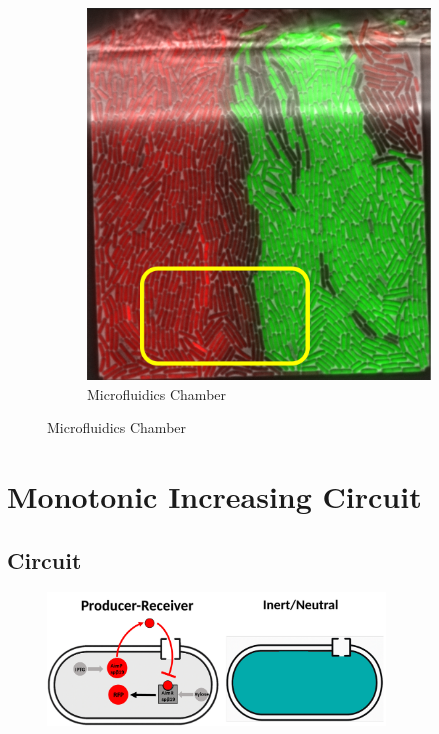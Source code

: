 \documentclass[11pt,a4paper]{article}
\begin{document}
\begin{figure}[H]
    \hfill
    \begin{subfigure}[b]{0.45\textwidth}
        \centering
        \includegraphics[width=\textwidth]{../figures/monotonicDecreasingReal.png}
        \caption{Microfluidics Chamber}
        \label{fig:mono_dec_real}
    \end{subfigure}
    \label{fig:mono_dec_comparison}
\end{figure}

\section{Monotonic Increasing Circuit}

\subsection{Circuit}

\begin{figure}[H]
    \centering
    \includegraphics[width=0.8\textwidth]{../figures/monIncDiag.png}
    \label{fig:mono_dec_schematic}
\end{figure}
\end{document}
